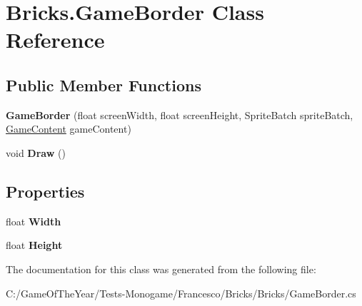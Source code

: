 \hypertarget{class_bricks_1_1_game_border}{}\section{Bricks.\+Game\+Border Class Reference}
\label{class_bricks_1_1_game_border}
\subsection*{Public Member Functions}
\begin{DoxyCompactItemize}
\item 
\mbox{\label{class_bricks_1_1_game_border_a5253423bc9ae6de493d0c2f3fcf10596}} 
{\bfseries Game\+Border} (float screen\+Width, float screen\+Height, Sprite\+Batch sprite\+Batch, \mbox{\hyperlink{class_bricks_1_1_game_content}{Game\+Content}} game\+Content)
\item 
\mbox{\label{class_bricks_1_1_game_border_a73b47ed5e7dcfc8b5d19c3e2ba949114}} 
void {\bfseries Draw} ()
\end{DoxyCompactItemize}
\subsection*{Properties}
\begin{DoxyCompactItemize}
\item 
\mbox{\label{class_bricks_1_1_game_border_a70369bbadd94a8a6c2f8a5276a58e372}} 
float {\bfseries Width}
\item 
\mbox{\label{class_bricks_1_1_game_border_ad20c4bf186bc1df76f004bd2511e9cf1}} 
float {\bfseries Height}
\end{DoxyCompactItemize}


The documentation for this class was generated from the following file\+:\begin{DoxyCompactItemize}
\item 
C\+:/\+Game\+Of\+The\+Year/\+Tests-\/\+Monogame/\+Francesco/\+Bricks/\+Bricks/Game\+Border.\+cs\end{DoxyCompactItemize}
